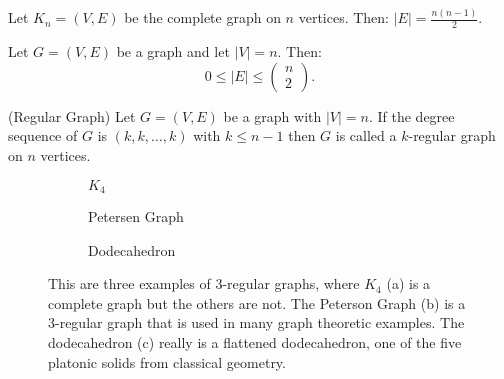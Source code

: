 \begin{lemma}
Let \(K_n = (V, E)\) be the complete graph on \(n\) vertices.
Then: \(|E| = \frac{n(n-1)}{2}\).
\end{lemma}
%
\begin{corollary}
Let \(G = (V, E)\) be a graph and let \(|V | = n\).
Then:
\[0\leq |E|\leq  \begin{pmatrix}n\\2\end{pmatrix}.\]
\end{corollary}

\begin{definition}{(Regular Graph)}
Let \(G = (V,E)\) be a graph with \(|V| = n\).
If the degree sequence of \(G\) is \((k, k,\ldots, k)\) with \(k \leq n-1\) then \(G\) is called a \(k\)-regular graph on \(n\) vertices.
\end{definition}
%


%
\begin{figure}
  \centering
  \begin{subfigure}[b]{0.32\textwidth}
    \centering
    
    \caption{\(K_4\)}\label{fig:graph4a}
  \end{subfigure}
  \begin{subfigure}[b]{0.32\textwidth}
    \centering
    
    \caption{Petersen Graph}\label{fig:graph4b}
  \end{subfigure}
  \begin{subfigure}[b]{0.32\textwidth}
    \centering
    
    \caption{Dodecahedron}\label{fig:graph4c}
  \end{subfigure}
  \caption{This are three examples of 3-regular graphs, where $K_4$ (a) is a complete graph but the others are not. The Peterson Graph (b) is a 3-regular graph that is used in many graph theoretic examples. The dodecahedron (c) really is a flattened dodecahedron, one of the five platonic solids from classical geometry.}\label{fig:graph4}
\end{figure}
%
